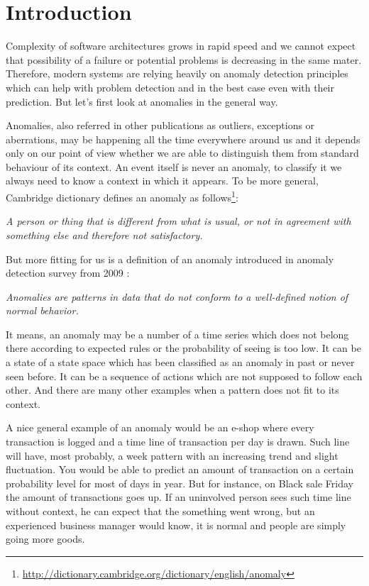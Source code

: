 \chapter{Introduction}

Complexity of software architectures grows in rapid speed and we cannot expect that possibility of a failure or potential problems is decreasing in the same mater. Therefore, modern systems are relying heavily on anomaly detection principles which can help with problem detection and in the best case even with their prediction. But let’s first look at anomalies in the general way.

Anomalies, also referred in other publications as outliers, exceptions or aberrations, may be happening all the time everywhere around us and it depends only on our point of view whether we are able to distinguish them from standard behaviour of its context. An event itself is never an anomaly, to classify it we always need to know a context in which it appears. To be more general, Cambridge dictionary defines an anomaly as follows\footnote{\url{http://dictionary.cambridge.org/dictionary/english/anomaly}}:
\begin{center}\textit{A person or thing that is different from what is usual, or not in agreement with something else and therefore not satisfactory. }
\end{center}
But more fitting for us is a definition of an anomaly introduced in anomaly detection survey from 2009 \cite{chandola2009anomaly}:
\begin{center}
\textit{Anomalies are patterns in data that do not conform to a well-defined notion of normal behavior.}
\end{center}

It means, an anomaly may be a number of a time series which does not belong there according to expected rules or the probability of seeing is too low. It can be a state of a state space which has been classified as an anomaly in past or never seen before. It can be a sequence of actions which are not supposed to follow each other. And there are many other examples when a pattern does not fit to its context.

A nice general example of an anomaly would be an e-shop where every transaction is logged and a time line of transaction per day is drawn. Such line will have, most probably, a week pattern with an increasing trend and slight fluctuation. You would be able to predict an amount of transaction on a certain probability level for most of days in year. But for instance, on Black sale Friday the amount of transactions goes up. If an uninvolved person sees such time line without context, he can expect that the something went wrong, but an experienced business manager would know, it is normal and people are simply going more goods.

